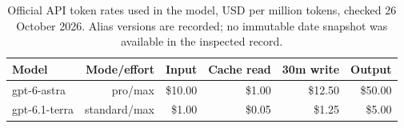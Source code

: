 \begin{table}[!htbp]\centering\small
\caption{Official API token rates used in the model, USD per million tokens, checked 26 October 2026. Alias versions are recorded; no immutable date snapshot was available in the inspected record.}
\begin{tabularx}{\linewidth}{Yrrrrr}\toprule
Model & Mode/effort & Input & Cache read & 30m write & Output\\\midrule
gpt-6-astra & pro/max & \$10.00 & \$1.00 & \$12.50 & \$50.00\\
gpt-6.1-terra & standard/max & \$1.00 & \$0.05 & \$1.25 & \$5.00\\
\bottomrule
\end{tabularx}
\par{}\par
\end{table}
